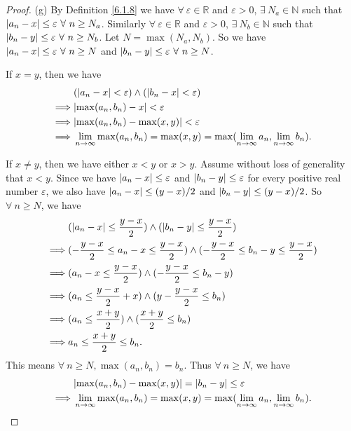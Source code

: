 \begin{proof}{(g)}
By Definition \ref{6.1.8} we have \(\forall\ \varepsilon \in \mathds{R}\) and \(\varepsilon > 0\), \(\exists\ N_a \in \mathds{N}\) such that \(\abs*{a_n - x} \leq \varepsilon \ \forall\ n \geq N_a\).
Similarly \(\forall\ \varepsilon \in \mathds{R}\) and \(\varepsilon > 0\), \(\exists\ N_b \in \mathds{N}\) such that \(\abs*{b_n - y} \leq \varepsilon \ \forall\ n \geq N_b\).
Let \(N = \max(N_a, N_b)\).
So we have \(\abs*{a_n - x} \leq \varepsilon \ \forall\ n \geq N\) and \(\abs*{b_n - y} \leq \varepsilon \ \forall\ n \geq N\).

If \(x = y\), then we have
\begin{align*}
& (\abs*{a_n - x} < \varepsilon) \land (\abs*{b_n - x} < \varepsilon) \\
\implies & \abs*{\max(a_n, b_n) - x} < \varepsilon \\
\implies & \abs*{\max(a_n, b_n) - \max(x, y)} < \varepsilon \\
\implies & \lim_{n \to \infty} \max(a_n, b_n) = \max(x, y) = \max(\lim_{n \to \infty} a_n, \lim_{n \to \infty} b_n).
\end{align*}

If \(x \neq y\), then we have either \(x < y\) or \(x > y\).
Assume without loss of generality that \(x < y\).
Since we have \(\abs*{a_n - x} \leq \varepsilon\) and \(\abs*{b_n - y} \leq \varepsilon\) for every positive real number \(\varepsilon\), we also have \(\abs*{a_n - x} \leq (y - x) / 2\) and \(\abs*{b_n - y} \leq (y - x) / 2\).
So \(\forall\ n \geq N\), we have
\begin{align*}
& (\abs*{a_n - x} \leq \frac{y - x}{2}) \land (\abs*{b_n - y} \leq \frac{y - x}{2}) \\
\implies & (-\frac{y - x}{2} \leq a_n - x \leq \frac{y - x}{2}) \land (-\frac{y - x}{2} \leq b_n - y \leq \frac{y - x}{2}) \\
\implies & (a_n - x \leq \frac{y - x}{2}) \land (-\frac{y - x}{2} \leq b_n - y) \\
\implies & (a_n \leq \frac{y - x}{2} + x) \land (y - \frac{y - x}{2} \leq b_n) \\
\implies & (a_n \leq \frac{x + y}{2}) \land (\frac{x + y}{2} \leq b_n) \\
\implies & a_n \leq \frac{x + y}{2} \leq b_n.
\end{align*}
This means \(\forall\ n \geq N, \max(a_n, b_n) = b_n\).
Thus \(\forall\ n \geq N\), we have
\begin{align*}
& \abs*{\max(a_n, b_n) - \max(x, y)} = \abs*{b_n - y} \leq \varepsilon \\
\implies & \lim_{n \to \infty} \max(a_n, b_n) = \max(x, y) = \max(\lim_{n \to \infty} a_n, \lim_{n \to \infty} b_n).
\end{align*}
\end{proof}

